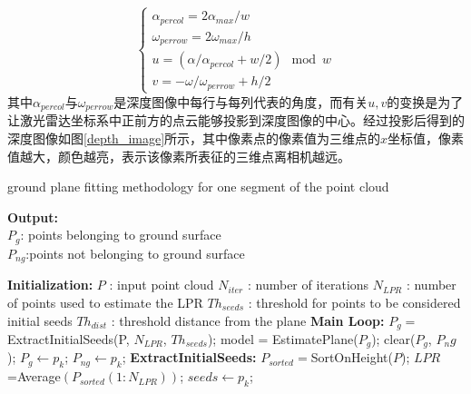 \begin{equation}
    \begin{cases}
        \alpha_{percol} = 2\alpha_{max} / w \\
        \omega_{perrow} = 2\omega_{max} / h \\
        u = (\alpha / \alpha_{percol} + w / 2) \mod w \\
        v = - \omega / \omega_{perrow} + h / 2
    \end{cases}
\end{equation}
其中$\alpha_{percol}$与$\omega_{perrow}$是深度图像中每行与每列代表的角度，而有关$u,v$的变换是为了让激光雷达坐标系中正前方的点云能够投影到深度图像的中心。经过投影后得到的深度图像如图\ref{depth_image}所示，其中像素点的像素值为三维点的$x$坐标值，像素值越大，颜色越亮，表示该像素所表征的三维点离相机越远。

\begin{algorithm}[t]
    \caption{ground plane fitting methodology for one segment of the point cloud} %
    \label{ground plane fitting}
    \hspace*{0.02in} {\bf Output:} %
\\ $P_g$: points belonging to ground surface \\
$P_{ng}$:points not belonging to ground surface 

    \begin{algorithmic}[1]
    \State\hspace*{0.02in} {\bf Initialization:} %
    \State $P$ : input point cloud
    \State $N_{iter}$ : number of iterations
    \State $N_{LPR}$ : number of points used to estimate the LPR
    \State $Th_{seeds}$ : threshold for points to be considered initial seeds
    \State $Th_{dist}$ : threshold distance from the plane
    \State\hspace*{0.02in} {\bf Main Loop:} %
    \State $P_g=$  ExtractInitialSeeds(P, $N_{LPR}$, $Th_{seeds}$);
        \State model = EstimatePlane($P_g$);
        \State clear($P_g$, $P_ng$);
                \State $P_g \leftarrow p_k$;
            \Else
                \State $P_{ng} \leftarrow p_k$;
            \EndIf
        \EndFor
    \EndFor
    \State\hspace*{0.02in} {\bf ExtractInitialSeeds:}
    \State $P_{sorted}=$SortOnHeight($P$);
    \State $LPR$=Average$(P_{sorted}(1:N_{LPR}))$;
          \State $seeds\leftarrow p_k$;
        \EndIf
    \EndFor
    \end{algorithmic}
\end{algorithm}

